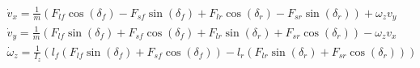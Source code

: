 \documentclass[12pt]{article}
\begin{document}
    \begin{equation}
        \label{bicycle dynamics II}
        \begin{aligned}
            \dot{v}_x = \frac{1}{m} (F_{lf} \cos(\delta_f) - F_{sf} \sin(\delta_f) + F_{lr} \cos(\delta_r) - F_{sr} \sin(\delta_r)) + \omega_z v_y  \\
            \dot{v}_y = \frac{1}{m} (F_{lf} \sin(\delta_f) + F_{sf} \cos(\delta_f) + F_{lr} \sin(\delta_r) + F_{sr} \cos(\delta_r)) - \omega_z v_x  \\
            \dot{\omega}_z = \frac{1}{I_z} (l_f(F_{lf} \sin(\delta_f) + F_{sf} \cos(\delta_f)) - l_r(F_{lr} \sin(\delta_r) + F_{sr} \cos(\delta_r))) \\
        \end{aligned}
    \end{equation}






    
\end{document}
